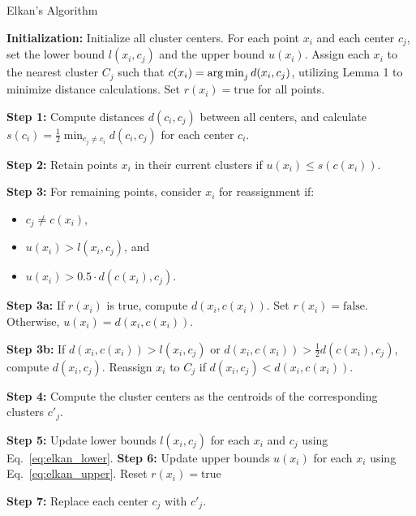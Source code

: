 \begin{algorithm}
	\caption{Elkan's Algorithm}
	\label{alg:elkan}
	\begin{algorithmic}
		\State \textbf{Initialization:} Initialize all cluster centers. For each point $x_i$ and each center $c_j$, set the lower bound $l(x_i,c_j)$ and the upper bound $u(x_i)$. Assign each $x_i$ to the nearest cluster $C_j$ such that $c(x_i) = \operatorname*{arg\,min}_j d(x_i, c_j)$, utilizing Lemma 1 to minimize distance calculations. Set $r(x_i) = \text{true}$ for all points.

		\Repeat
		\State \textbf{Step 1:} Compute distances $d(c_i, c_j)$ between all centers, and calculate $s(c_i) = \frac{1}{2} \min_{c_j \neq c_i} d(c_i, c_j)$ for each center $c_i$.

		\State \textbf{Step 2:} Retain points $x_i$ in their current clusters if $u(x_i) \leq s(c(x_i))$.

		\State \textbf{Step 3:} For remaining points, consider $x_i$ for reassignment if:
		\begin{itemize}[leftmargin=5em,itemindent=\algorithmicindent,itemsep=0pt,parsep=0pt]
			\item $c_j \neq c(x_i)$,
			\item $u(x_i) > l(x_i, c_j)$, and
			\item $u(x_i) > 0.5 \cdot d(c(x_i), c_j)$.
		\end{itemize}

		\State \textbf{Step 3a:} If $r(x_i)$ is true, compute $d(x_i, c(x_i))$. Set $r(x_i) = \text{false}$. Otherwise, $u(x_i) = d(x_i, c(x_i))$.

		\State \textbf{Step 3b:} If $d(x_i, c(x_i)) > l(x_i, c_j)$ or $d(x_i, c(x_i)) > \frac{1}{2}d(c(x_i), c_j)$, compute $d(x_i, c_j)$. Reassign $x_i$ to $C_j$ if $d(x_i, c_j) < d(x_i, c(x_i))$.

		\State \textbf{Step 4:} Compute the cluster centers as the centroids of the corresponding clusters $c'_j$.

		\State \textbf{Step 5:} Update lower bounds $l(x_i, c_j)$ for each $x_i$ and $c_j$ using Eq.~\ref{eq:elkan_lower}.
		\State \textbf{Step 6:} Update upper bounds $u(x_i)$ for each $x_i$ using Eq.~\ref{eq:elkan_upper}. Reset $r(x_i) = \text{true}$

		\State \textbf{Step 7:} Replace each center $c_j$ with $c'_j$.
	\end{algorithmic}
\end{algorithm}

